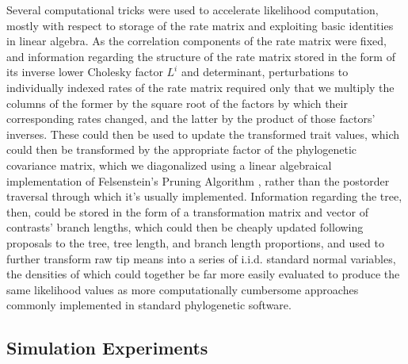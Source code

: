 Several computational tricks were used to accelerate likelihood computation, mostly with respect to storage of the rate matrix and exploiting basic identities in linear algebra. As the correlation components of the rate matrix were fixed, and information regarding the structure of the rate matrix stored in the form of its inverse lower Cholesky factor $L^i$ and determinant, perturbations to individually indexed rates of the rate matrix required only that we multiply the columns of the former by the square root of the factors by which their corresponding rates changed, and the latter by the product of those factors' inverses. These could then be used to update the transformed trait values, which could then be transformed by the appropriate factor of the phylogenetic covariance matrix, which we diagonalized using a linear algebraical implementation of Felsenstein's Pruning Algorithm \citep{felsensteinMaximumlikelihoodEstimationEvolutionary1973}, rather than the postorder traversal through which it's usually implemented. Information regarding the tree, then, could be stored in the form of a transformation matrix and vector of contrasts' branch lengths, which could then be cheaply updated following proposals to the tree, tree length, and branch length proportions, and used to further transform raw tip means into a series of i.i.d. standard normal variables, the densities of which could together be far more easily evaluated to produce the same likelihood values as more computationally cumbersome approaches commonly implemented in standard phylogenetic software.

\subsection{Simulation Experiments}

